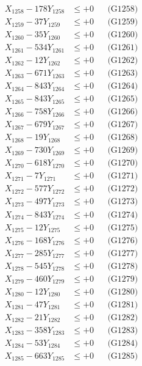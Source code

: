 \documentclass[a4paper,10pt]{article}
\begin{document}
{\begin{align}
X_{1258} - 178Y_{1258} &\leq +0 && \text{(G1258)} \\
X_{1259} - 37Y_{1259} &\leq +0 && \text{(G1259)} \\
X_{1260} - 35Y_{1260} &\leq +0 && \text{(G1260)} \\
\allowbreak
X_{1261} - 534Y_{1261} &\leq +0 && \text{(G1261)} \\
X_{1262} - 12Y_{1262} &\leq +0 && \text{(G1262)} \\
X_{1263} - 671Y_{1263} &\leq +0 && \text{(G1263)} \\
X_{1264} - 843Y_{1264} &\leq +0 && \text{(G1264)} \\
X_{1265} - 843Y_{1265} &\leq +0 && \text{(G1265)} \\
X_{1266} - 758Y_{1266} &\leq +0 && \text{(G1266)} \\
X_{1267} - 679Y_{1267} &\leq +0 && \text{(G1267)} \\
X_{1268} - 19Y_{1268} &\leq +0 && \text{(G1268)} \\
X_{1269} - 730Y_{1269} &\leq +0 && \text{(G1269)} \\
X_{1270} - 618Y_{1270} &\leq +0 && \text{(G1270)} \\
\allowbreak
X_{1271} - 7Y_{1271} &\leq +0 && \text{(G1271)} \\
X_{1272} - 577Y_{1272} &\leq +0 && \text{(G1272)} \\
X_{1273} - 497Y_{1273} &\leq +0 && \text{(G1273)} \\
X_{1274} - 843Y_{1274} &\leq +0 && \text{(G1274)} \\
X_{1275} - 12Y_{1275} &\leq +0 && \text{(G1275)} \\
X_{1276} - 168Y_{1276} &\leq +0 && \text{(G1276)} \\
X_{1277} - 285Y_{1277} &\leq +0 && \text{(G1277)} \\
X_{1278} - 545Y_{1278} &\leq +0 && \text{(G1278)} \\
X_{1279} - 460Y_{1279} &\leq +0 && \text{(G1279)} \\
X_{1280} - 12Y_{1280} &\leq +0 && \text{(G1280)} \\
\allowbreak
X_{1281} - 47Y_{1281} &\leq +0 && \text{(G1281)} \\
X_{1282} - 21Y_{1282} &\leq +0 && \text{(G1282)} \\
X_{1283} - 358Y_{1283} &\leq +0 && \text{(G1283)} \\
X_{1284} - 53Y_{1284} &\leq +0 && \text{(G1284)} \\
X_{1285} - 663Y_{1285} &\leq +0 && \text{(G1285)} \\

\end{align}}
\end{document}
